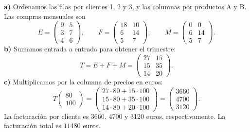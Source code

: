 \textbf{a)} Ordenamos las filas por clientes 1, 2 y 3, y las columnas por productos A y B. Las compras mensuales son
\[
 E=\begin{pmatrix}9&5\\3&7\\4&6\end{pmatrix},\qquad
 F=\begin{pmatrix}18&10\\6&14\\5&7\end{pmatrix},\qquad
 M=\begin{pmatrix}0&0\\6&14\\5&7\end{pmatrix}.
\]
\textbf{b)} Sumamos entrada a entrada para obtener el trimestre:
\[
 T=E+F+M=\boxed{\begin{pmatrix}27&15\\15&35\\14&20\end{pmatrix}}.
\]
\textbf{c)} Multiplicamos por la columna de precios en euros:
\[
 T\begin{pmatrix}80\\100\end{pmatrix}
 =\begin{pmatrix}27\cdot80+15\cdot100\\15\cdot80+35\cdot100\\14\cdot80+20\cdot100\end{pmatrix}
 =\begin{pmatrix}3660\\4700\\3120\end{pmatrix}.
\]
La facturación por cliente es 3660, 4700 y 3120 euros, respectivamente. La facturación total es $\boxed{11480}$ euros.
